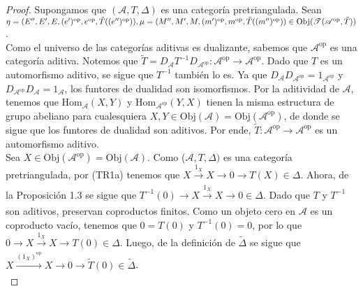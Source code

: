 \documentclass[tesis]{subfiles}
\begin{document}
\begin{proof}

    Supongamos que $(\mathscr{A},T,\Delta)$ es una categoría pretriangulada. Sean $\eta=(E'',E',E,(e')^\text{op},\break e^\text{op},\tilde{T}((e'')^\text{op})), \mu=(M'',M',M,(m')^\text{op},m^\text{op},\tilde{T}((m'')^\text{op}))\in\text{Obj}(\mathscr{T}(\mathscr{A}^\text{op},\tilde{T}))$. \\

    Como el universo de las categorías aditivas es dualizante, sabemos que $\mathscr{A}^\text{op}$ es una categoría aditiva. Notemos que $\tilde{T} = D_\mathscr{A} T^{-1} D_{\mathscr{A}^\text{op}}:\mathscr{A}^\text{op}\to \mathscr{A}^\text{op}$. Dado que $T$ es un automorfismo aditivo, se sigue que $T^{-1}$ también lo es. Ya que $D_\mathscr{A}D_{\mathscr{A}^\text{op}} = 1_{\mathscr{A}^\text{op}}$ y $D_{\mathscr{\mathscr{A}}^\text{op}}D_\mathscr{A} = 1_\mathscr{A}$, los funtores de dualidad son isomorfismos. Por la aditividad de $\mathscr{A}$, tenemos que $\text{Hom}_\mathscr{A}(X,Y)$ y $\text{Hom}_{\mathscr{A}^\text{op}}(Y,X)$ tienen la misma estructura de grupo abeliano para cualesquiera $X,Y\in\text{Obj}(\mathscr{A}) = \text{Obj}(\mathscr{A}^\text{op})$, de donde se sigue que los funtores de dualidad son aditivos. Por ende, $\tilde{T}:\mathscr{A}^\text{op}\to \mathscr{A}^\text{op}$ es un automorfismo aditivo. \\

    Sea $X\in\text{Obj}(\mathscr{A}^\text{op})=\text{Obj}(\mathscr{A})$. Como ($\mathscr{A},T,\Delta)$ es una categoría pretriangulada, por (TR1a) tenemos que $X\xrightarrow[]{1_X}X\to 0\to T(X)\in\Delta$. Ahora, de la Proposición 1.3 se sigue que $T^{-1}(0)\to X\xrightarrow[]{1_X}X\to 0\in\Delta$. Dado que $T$ y $T^{-1}$ son aditivos, preservan coproductos finitos. Como un objeto cero en $\mathscr{A}$ es un coproducto vacío, tenemos que $0=T(0)$ y $T^{-1}(0)=0$, por lo que $0\to X\xrightarrow[]{1_X}X\to T(0)\in\Delta$. Luego, de la definición de $\tilde{\Delta}$ se sigue que $X\xrightarrow[]{(1_X)^\text{op}}X\to 0\to \tilde{T}(0)\in\tilde{\Delta}$. \\


\end{proof}
\end{document}

